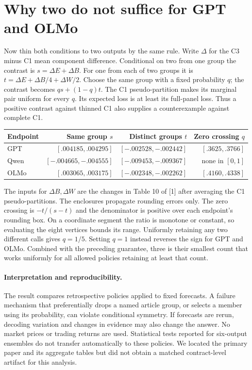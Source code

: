 \documentclass[11pt]{article}
\begin{document}
\section{Why two do not suffice for GPT and OLMo}
Now thin both conditions to two outputs by the same rule. Write $\Delta$ for the C3 minus C1 mean component difference. Conditional on two from one group the contrast is $s=\Delta E+\Delta B$. For one from each of two groups it is $t=\Delta E+\Delta B/4+\Delta W/2$. Choose the same group with a fixed probability $q$; the contrast becomes $qs+(1-q)t$. The C1 pseudo-partition makes its marginal pair uniform for every $q$. Its expected loss is at least its full-panel loss. Thus a positive contrast against thinned C1 also supplies a counterexample against complete C1.
\newpage
\begin{center}
\begin{tabular}{lrrr}
\toprule
Endpoint& Same group $s$ & Distinct groups $t$ & Zero crossing $q$\\
\midrule
GPT&$[.004185,.004295]$&$[-.002528,-.002442]$&$[.3625,.3766]$\\
Qwen&$[-.004665,-.004555]$&$[-.009453,-.009367]$&none in $[0,1]$\\
OLMo&$[.003065,.003175]$&$[-.002348,-.002262]$&$[.4160,.4338]$\\
\bottomrule
\end{tabular}
\end{center}
The inputs for $\Delta B,\Delta W$ are the changes in Table 10 of [1] after averaging the C1 pseudo-partitions. The enclosures propagate rounding errors only. The zero crossing is $-t/(s-t)$ and the denominator is positive over each endpoint's rounding box. On a coordinate segment the ratio is monotone or constant, so evaluating the eight vertices bounds its range. Uniformly retaining any two different calls gives $q=1/5$. Setting $q=1$ instead reverses the sign for GPT and OLMo. Combined with the preceding guarantee, three is their smallest count that works uniformly for all allowed policies retaining at least that count.

\paragraph{Interpretation and reproducibility.}
The result compares retrospective policies applied to fixed forecasts. A failure mechanism that preferentially drops a named article group, or selects a member using its probability, can violate conditional symmetry. If forecasts are rerun, decoding variation and changes in evidence may also change the answer. No market prices or trading returns are used. Statistical tests reported for six-output ensembles do not transfer automatically to these policies. We located the primary paper and its aggregate tables but did not obtain a matched contract-level artifact for this analysis.
\end{document}
